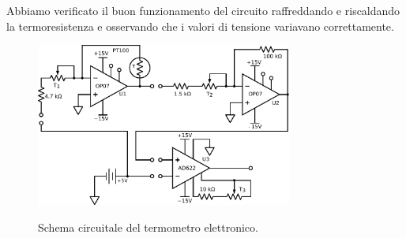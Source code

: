 Abbiamo verificato il buon funzionamento del circuito raffreddando e riscaldando la termoresistenza e osservando che i valori di tensione variavano correttamente.

\begin{figure}[ht]
 \centering
   {\includegraphics[width=0.75\textwidth]{../E06/latex/c1.pdf}}
 \caption{Schema circuitale del termometro elettronico.}
 \label{gr6:sbil_amp_diff}
\end{figure}
